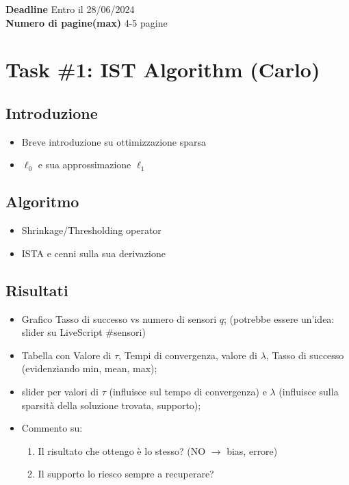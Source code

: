\noindent
\textbf{Deadline}
    {\color{red}Entro il 28/06/2024}\\
\noindent
\textbf{Numero di pagine(max)}  4-5 pagine

\section*{Task \#1: IST Algorithm (Carlo)}
\subsection*{Introduzione}
\begin{itemize}
    \itemsep0em
    \item Breve introduzione su ottimizzazione sparsa
    \item $\ell_0$ e sua approssimazione $\ell_1$ 
\end{itemize}
\subsection*{Algoritmo}
\begin{itemize}
    \itemsep0em
    \item Shrinkage/Thresholding operator
    \item ISTA e cenni sulla sua derivazione
\end{itemize}
\subsection*{Risultati}
\begin{itemize}
    \item Grafico Tasso di successo vs numero di sensori $q$; (potrebbe essere un'idea: slider su LiveScript \#sensori)
    \item Tabella con Valore di $\tau$, Tempi di convergenza, valore di $\lambda$, Tasso di successo (evidenziando min, mean, max);
    \item slider per valori di $\tau$ (influisce sul tempo di convergenza) e $\lambda$ (influisce sulla sparsità della soluzione trovata, supporto);
    \item Commento su: 
    \begin{enumerate}
        \item Il risultato che ottengo \`e lo stesso? (NO $\to$ bias, errore)
        \item Il supporto lo riesco sempre a recuperare?
    \end{enumerate}
\end{itemize}

